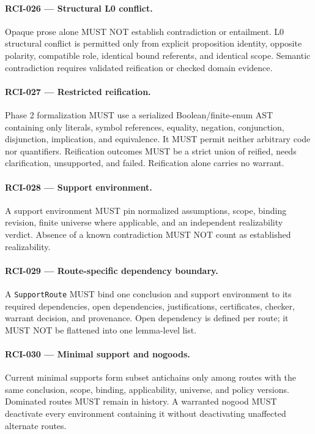 \documentclass[11pt]{article}
\begin{document}
\paragraph{RCI-026 --- Structural L0 conflict.}
Opaque prose alone MUST NOT establish contradiction or entailment. L0
structural conflict is permitted only from explicit proposition identity,
opposite polarity, compatible role, identical bound referents, and identical
scope. Semantic contradiction requires validated reification or checked domain
evidence.

\paragraph{RCI-027 --- Restricted reification.}
Phase 2 formalization MUST use a serialized Boolean/finite-enum AST containing
only literals, symbol references, equality, negation, conjunction,
disjunction, implication, and equivalence. It MUST permit neither arbitrary
code nor quantifiers. Reification outcomes MUST be a strict union of reified,
needs clarification, unsupported, and failed. Reification alone carries no
warrant.

\paragraph{RCI-028 --- Support environment.}
A support environment MUST pin normalized assumptions, scope, binding revision,
finite universe where applicable, and an independent realizability verdict.
Absence of a known contradiction MUST NOT count as established realizability.

\paragraph{RCI-029 --- Route-specific dependency boundary.}
A \texttt{SupportRoute} MUST bind one conclusion and support environment to its
required dependencies, open dependencies, justifications, certificates,
checker, warrant decision, and provenance. Open dependency is defined per
route; it MUST NOT be flattened into one lemma-level list.

\paragraph{RCI-030 --- Minimal support and nogoods.}
Current minimal supports form subset antichains only among routes with the same
conclusion, scope, binding, applicability, universe, and policy versions.
Dominated routes MUST remain in history. A warranted nogood MUST deactivate
every environment containing it without deactivating unaffected alternate
routes.
\end{document}
